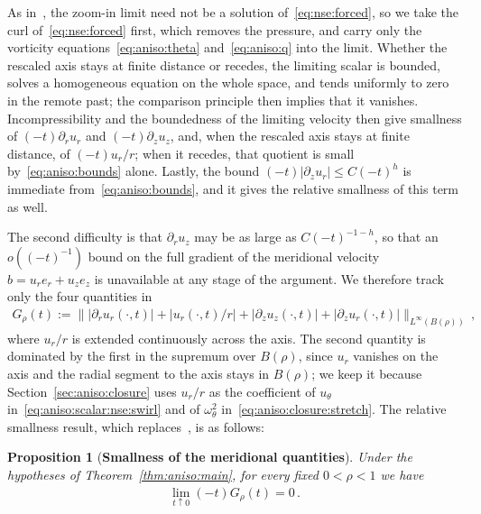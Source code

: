 \documentclass[11pt,reqno]{amsproc}
\numberwithin{equation}{section}
\newtheorem{proposition}[theorem]{Proposition}
\theoremstyle{remark}
\newcommand{\p}{\partial}
\begin{document}
As in~\cite{CIVEulerLength}, the zoom-in limit need not be a solution of~\eqref{eq:nse:forced}, so we take the curl of~\eqref{eq:nse:forced} first, which removes the pressure, and carry only the vorticity equations~\eqref{eq:aniso:theta} and~\eqref{eq:aniso:q} into the limit. Whether the rescaled axis stays at finite distance or recedes, the limiting scalar is bounded, solves a homogeneous equation on the whole space, and tends uniformly to zero in the remote past; the comparison principle then implies that it vanishes. Incompressibility and the boundedness of the limiting velocity then give smallness of $(-t)\p_ru_r$ and $(-t)\p_zu_z$, and, when the rescaled axis stays at finite distance, of $(-t)u_r/r$; when it recedes, that quotient is small by~\eqref{eq:aniso:bounds} alone. Lastly, the bound $(-t)|\p_zu_r|\le C(-t)^h$ is immediate from~\eqref{eq:aniso:bounds}, and it gives the relative smallness of this term as well.

The second difficulty is that $\p_ru_z$ may be as large as $C(-t)^{-1-h}$, so that an $o((-t)^{-1})$ bound on the full gradient of the meridional velocity $b = u_r e_r+u_z e_z$ is unavailable at any stage of the argument. We therefore track only the four quantities in 
\begin{align}
G_\rho(t):=\bigl\| 
|\p_r u_r (\cdot,t)|+|u_r(\cdot,t)/r |+|\p_z u_z (\cdot,t)|+|\p_z u_r (\cdot,t)|
\bigr\|_{L^\infty(B(\rho))}
\,,
\label{eq:aniso:G}
\end{align}
where $u_r/r$ is extended continuously across the axis. The second quantity is dominated by the first in the supremum over $B(\rho)$, since $u_r$ vanishes on the axis and the radial segment to the axis stays in $B(\rho)$; we keep it because Section~\ref{sec:aniso:closure} uses $u_r/r$ as the coefficient of $u_\theta$ in~\eqref{eq:aniso:scalar:nse:swirl} and of $\omega_\theta^2$ in~\eqref{eq:aniso:closure:stretch}. The relative smallness result, which replaces~\cite[Proposition~3.1]{CIVEulerLength}, is as follows: 

\begin{proposition}[{\bf Smallness of the meridional quantities}]
\label{prop:aniso:small}
Under the hypotheses of Theorem~\ref{thm:aniso:main}, for every fixed $0<\rho<1$ we have
\begin{align}
\lim_{t\uparrow0}(-t)G_\rho(t)=0
\,.
\label{eq:aniso:small}
\end{align}
\end{proposition}
\end{document}

